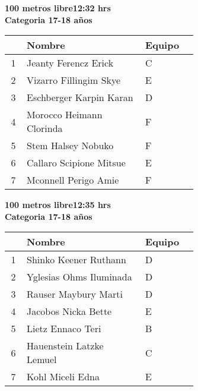 \begin{minipage}{0.95\linewidth}\vspace{0.5cm} 
\begin{flushleft}
\textbf{
\hspace{-0.15cm}100 metros libre\hspace{1.5cm}12:32 hrs \\Categoria 17-18 años}\vspace{-0.2cm} 
\end{flushleft}
\begin{tabular}{cp{0.63\linewidth}l}
\hline
& \textbf{Nombre} & \textbf{Equipo} \\ \hline
1 & Jeanty Ferencz Erick & C \\ 
2 & Vizarro Fillingim Skye & E \\ 
3 & Eschberger Karpin Karan & D \\ 
4 & Morocco Heimann Clorinda & F \\ 
5 & Stem Halsey Nobuko & F \\ 
6 & Callaro Scipione Mitsue & E \\ 
7 & Mconnell Perigo Amie & F \\ 
\end{tabular}
\end{minipage}
\begin{minipage}{0.95\linewidth}\vspace{0.5cm} 
\begin{flushleft}
\textbf{
\hspace{-0.15cm}100 metros libre\hspace{1.5cm}12:35 hrs \\Categoria 17-18 años}\vspace{-0.2cm} 
\end{flushleft}
\begin{tabular}{cp{0.63\linewidth}l}
\hline
& \textbf{Nombre} & \textbf{Equipo} \\ \hline
1 & Shinko Keener Ruthann & D \\ 
2 & Yglesias Ohms Iluminada & D \\ 
3 & Rauser Maybury Marti & D \\ 
4 & Jacobos Nicka Bette & E \\ 
5 & Lietz Ennaco Teri & B \\ 
6 & Hauenstein Latzke Lemuel & C \\ 
7 & Kohl Miceli Edna & E \\ 
\end{tabular}
\end{minipage}
